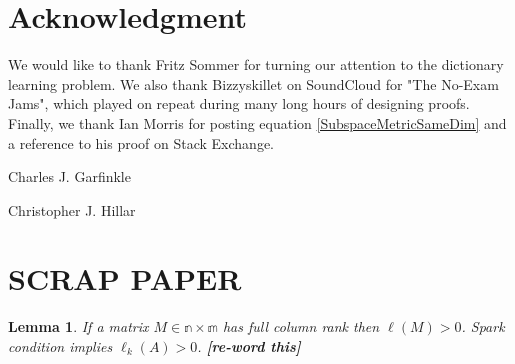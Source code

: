\documentclass[journal, onecolumn]{IEEEtran}
\newtheorem{lemma}{Lemma}
\begin{document}

\section*{Acknowledgment}
We would like to thank Fritz Sommer for turning our attention to the dictionary learning problem. We also thank Bizzyskillet on SoundCloud for "The No-Exam Jams", which played on repeat during many long hours of designing proofs. Finally, we thank Ian Morris for posting equation \eqref{SubspaceMetricSameDim} and a reference to his proof on Stack Exchange.






\begin{IEEEbiographynophoto}{Charles J. Garfinkle}
\end{IEEEbiographynophoto}

\begin{IEEEbiographynophoto}{Christopher J. Hillar}
\end{IEEEbiographynophoto}


\section*{SCRAP PAPER}

\begin{lemma}
If a matrix $M \in \mathbb{n \times m}$ has full column rank then $\ell(M) > 0$. Spark condition implies $\ell_k(A) > 0$. \textbf{[re-word this]}
\end{lemma}
\end{document}
